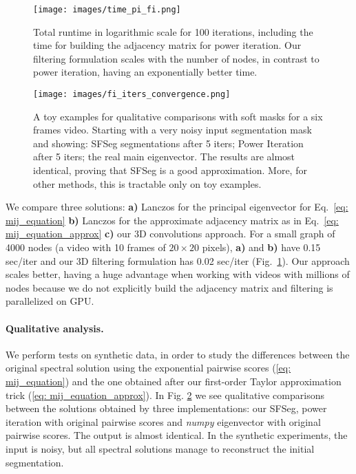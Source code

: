 \documentclass{article}
\begin{document}
\begin{figure}[t]
	\begin{center}
		\texttt{[image: images/time\_pi\_fi.png]}
	\end{center}
    \caption{Total runtime in logarithmic scale for 100 iterations, including the time for building the adjacency matrix for power iteration. Our filtering formulation scales with the number of nodes, in contrast to power iteration, having an exponentially better time.}
    \label{fig: time_pi_fi}
\end{figure}


\begin{figure}[h]
	\begin{center}
	    \texttt{[image: images/fi\_iters\_convergence.png]}
	\end{center}
    \caption{A toy examples for qualitative comparisons with soft masks for a six frames video. Starting with a very noisy input segmentation mask and showing: SFSeg segmentations after 5 iters; Power Iteration after 5 iters; the real main eigenvector. The results are almost identical, proving that SFSeg is a good approximation. More, for other methods, this is tractable only on toy examples.}
    \label{fig: fi_iters}
\end{figure}

We compare three solutions: \textbf{a)} Lanczos for the principal eigenvector for Eq.~\ref{eq: mij_equation} \textbf{b)} Lanczos for the approximate adjacency matrix as in Eq.~\ref{eq: mij_equation_approx} \textbf{c)} our 3D convolutions approach. For a small graph of 4000 nodes (a video with 10 frames of $20 \times 20$ pixels), \textbf{a)} and \textbf{b)} have 0.15 sec/iter and our 3D filtering formulation has 0.02 sec/iter (Fig.~\ref{fig: time_pi_fi}). Our approach scales better, having a huge advantage when working with videos with millions of nodes because we do not explicitly build the adjacency matrix and filtering is parallelized on GPU.



\paragraph{Qualitative analysis.} We perform tests on synthetic data, in order to study the differences between the original spectral solution using the exponential pairwise scores (\ref{eq: mij_equation}) and the one obtained after our first-order Taylor approximation trick (\ref{eq: mij_equation_approx}). In Fig. \ref{fig: fi_iters} we see qualitative comparisons between the solutions obtained by three implementations: our SFSeg, power iteration with original pairwise scores and \textit{numpy} eigenvector with original pairwise scores. The output is almost identical. In the synthetic experiments, the input is noisy, but all spectral solutions manage to reconstruct the initial segmentation. 
\end{document}
